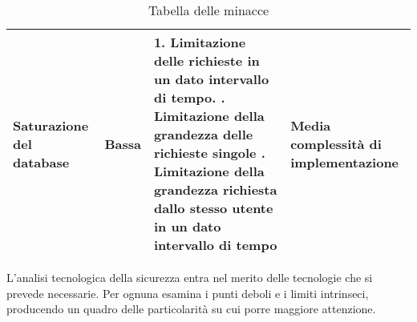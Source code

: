 \begin{table}[htbp]
\begin{tabular} {|P{3cm}|P{2cm}|P{6.1cm}|P{4cm}|}
        \hline
        Saturazione del database                          & Bassa            & 1. Limitazione delle richieste in un dato intervallo di tempo. . Limitazione della grandezza delle richieste singole . Limitazione della grandezza richiesta dallo stesso utente in un dato intervallo di tempo & Media complessità di implementazione                              \\
        \hline
    \end{tabular}

    \caption{Tabella delle minacce}
    \label{<label>}
\end{table}

\clearpage

L'analisi tecnologica della sicurezza entra nel merito delle tecnologie che si prevede necessarie.
Per ognuna esamina i punti deboli e i limiti intrinseci,
producendo un quadro delle particolarità su cui porre maggiore attenzione.\\
\\


